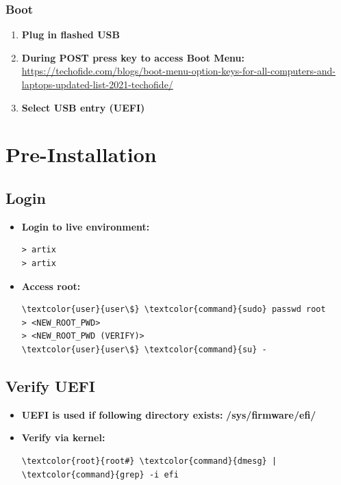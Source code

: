 \documentclass[10pt, a4paper, onecolumn, oneside, titlepage, openany]{book}
\begin{document}
\subsection{Boot}
\begin{enumerate}
    \item \textbf{Plug in flashed USB}
    \item \textbf{During POST press key to access Boot Menu:}
\newline \href{https://techofide.com/blogs/boot-menu-option-keys-for-all-computers-and-laptops-updated-list-2021-techofide/}{https://techofide.com/blogs/boot-menu-option-keys-for-all-computers-and-laptops-updated-list-2021-techofide/}
    \item \textbf{Select USB entry (UEFI)}
\end{enumerate}


\chapter{Pre-Installation}
\section{Login}
\begin{itemize}
    \item \textbf{Login to live environment:}
\begin{Verbatim}[commandchars=\\\{\}]
> artix
> artix
\end{Verbatim}
    \item \textbf{Access root:}
\begin{Verbatim}[commandchars=\\\{\}]
\textcolor{user}{user\$} \textcolor{command}{sudo} passwd root
> <NEW_ROOT_PWD>
> <NEW_ROOT_PWD (VERIFY)>
\textcolor{user}{user\$} \textcolor{command}{su} -
\end{Verbatim}
\end{itemize}

\section{Verify UEFI}
\begin{itemize}
    \item \textbf{UEFI is used if following directory exists:}
\newline \textbf{\textcolor{dir}{/sys/firmware/efi/}}
    \item \textbf{Verify via kernel:}
\begin{Verbatim}[commandchars=\\\{\}]
\textcolor{root}{root#} \textcolor{command}{dmesg} | \textcolor{command}{grep} -i efi
\end{Verbatim}
\end{itemize}
\end{document}

